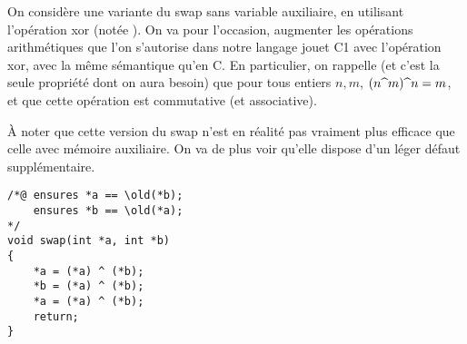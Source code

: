 \documentclass[11pt,answers]{exam}
\begin{document}
\begin{questions}


    On considère une variante du swap sans variable auxiliaire, en utilisant l’opération xor (notée \code{^}).
    On va pour l’occasion, augmenter les opérations arithmétiques que l’on s’autorise dans notre langage jouet C1 avec l’opération xor, avec la même sémantique qu’en C.
    En particulier, on rappelle (et c’est la seule propriété dont on aura besoin) que pour tous entiers $n,m$, $(n \code{^} m) \code{^} n = m$, et que cette opération est commutative (et associative).

    À noter que cette version du swap n’est en réalité pas vraiment plus efficace que celle avec mémoire auxiliaire. On va de plus voir qu’elle dispose d’un léger défaut supplémentaire.

    \begin{lstlisting}
/*@ ensures *a == \old(*b);
    ensures *b == \old(*a);
*/
void swap(int *a, int *b)
{
    *a = (*a) ^ (*b);
    *b = (*a) ^ (*b);
    *a = (*a) ^ (*b);
    return;
}
    \end{lstlisting}

\end{questions}
\end{document}
